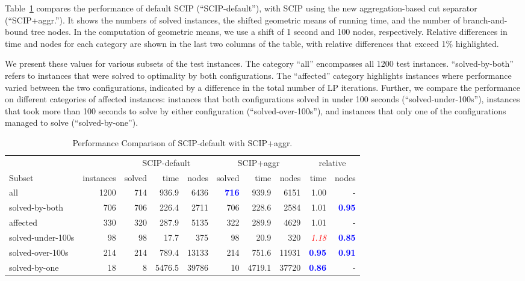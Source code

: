 \documentclass[a4paper,UKenglish,cleveref, autoref,  thm-restate]{lipics-v2021}
\newcommand{\win}[1]{\textbf{\textcolor{blue}{#1}}}
\newcommand{\loss}[1]{\textit{\textcolor{red}{#1}}}
\begin{document}
	
	
	
	
	
	Table~\ref{tbl:MIP5seeds} compares the performance of default SCIP (``SCIP-default''), with SCIP using the new aggregation-based cut separator (``SCIP+aggr.''). It shows the numbers of solved instances, the shifted geometric means of running time, and the number of branch-and-bound tree nodes. In the computation of geometric means, we use a shift of 1 second and 100 nodes, respectively. Relative differences in time and nodes for each category are shown in the last two columns of the table, with relative differences that exceed 1\% highlighted.
	
	
	We present these values for various subsets of the test instances. The category ``all'' encompasses all 1200 test instances. ``solved-by-both'' refers to instances that were solved to optimality by both configurations. The ``affected'' category highlights instances where performance varied between the two configurations, indicated by a difference in the total number of LP iterations. Further, we compare the performance on different categories of affected instances: instances that both configurations solved in under 100 seconds (``solved-under-100s''), instances that took more than 100 seconds to solve by either configuration (``solved-over-100s''), and instances that only one of the configurations managed to solve (``solved-by-one'').
	
	
	\begin{table}[h]
		\caption{Performance Comparison of SCIP-default with SCIP+aggr.}
		\label{tbl:MIP5seeds}
		\footnotesize
		\begin{tabularx}{\textwidth}{@{}l@{\;\;\extracolsep{\fill}}rrrrrrrrr@{}}
			\toprule
			&           & \multicolumn{3}{c}{SCIP-default} & \multicolumn{3}{c}{SCIP+aggr} & \multicolumn{2}{c}{relative} \\
			\cmidrule{3-5} \cmidrule{6-8} \cmidrule{9-10}
			Subset              & instances & solved & time & nodes & solved & time & nodes & time & nodes \\
			\midrule
			all & 1200 & 714 & 936.9 & 6436 & \win{716} & 939.9 & 6151 & 1.00 &  - \\
			solved-by-both & 706 & 706 & 226.4 & 2711 & 706 & 228.6 & 2584 & 1.01 & \win{0.95} \\
			\cmidrule{1-10}
			affected & 330 & 320 & 287.9 & 5135 & 322 & 289.9 & 4629 & 1.01 & - \\
			solved-under-100s & 98 & 98 & 17.7 & 375 & 98 & 20.9 & 320 & \loss{1.18}& \win{0.85}  \\
			solved-over-100s & 214 & 214 & 789.4 & 13133 & 214 & 751.6 & 11931 & \win{0.95} & \win{0.91}  \\
			solved-by-one & 18 & 8 & 5476.5 & 39786 & 10 & 4719.1 & 37720 & \win{0.86}  & - \\
			\bottomrule
		\end{tabularx}
	\end{table}
	
\end{document}
